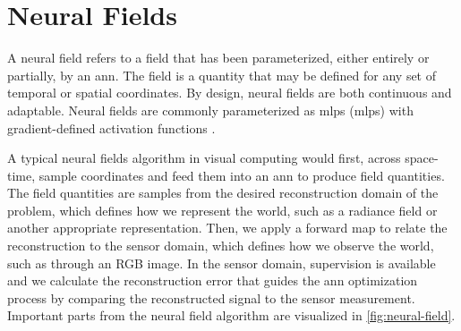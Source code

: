 \section{Neural Fields} %
A neural field refers to a field that has been parameterized, either entirely or partially, by an \acrfull{ann}. The field is a quantity that may be defined for any set of temporal or spatial coordinates. By design, neural fields are both continuous and adaptable. Neural fields are commonly parameterized as \acrlong{mlp}s (\acrshort{mlp}s) with gradient-defined activation functions \cite{xie_neural_2022}.

A typical neural fields algorithm in visual computing would first, across space-time, sample coordinates and feed them into an \acrshort{ann} to produce field quantities. The field quantities are samples from the desired reconstruction domain of the problem, which defines how we represent the world, such as a radiance field or another appropriate representation. Then, we apply a forward map to relate the reconstruction to the sensor domain, which defines how we observe the world, such as through an RGB image. In the sensor domain, supervision is available and we calculate the reconstruction error that guides the \acrshort{ann} optimization process by comparing the reconstructed signal to the sensor measurement. Important parts from the neural field algorithm are visualized in \autoref{fig:neural-field}.





